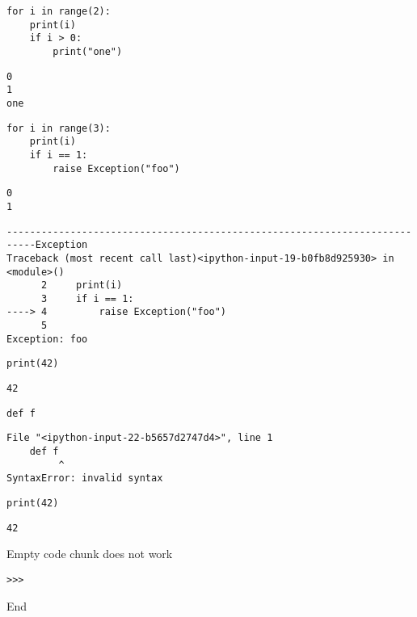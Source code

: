 \begin{verbatim}
for i in range(2):
    print(i)
    if i > 0:
        print("one")
\end{verbatim}
\begin{verbatim}
0
1
one
\end{verbatim}


\begin{verbatim}
for i in range(3):
    print(i)
    if i == 1:
        raise Exception("foo")
\end{verbatim}
\begin{verbatim}
0
1
\end{verbatim}
\begin{verbatim}
---------------------------------------------------------------------------Exception
Traceback (most recent call last)<ipython-input-19-b0fb8d925930> in
<module>()
      2     print(i)
      3     if i == 1:
----> 4         raise Exception("foo")
      5
Exception: foo
\end{verbatim}

\begin{verbatim}
print(42)
\end{verbatim}
\begin{verbatim}
42
\end{verbatim}


\begin{verbatim}
def f
\end{verbatim}
\begin{verbatim}
File "<ipython-input-22-b5657d2747d4>", line 1
    def f
         ^
SyntaxError: invalid syntax
\end{verbatim}

\begin{verbatim}
print(42)
\end{verbatim}
\begin{verbatim}
42
\end{verbatim}

Empty code chunk does not work

\begin{verbatim}
>>>

\end{verbatim}

End

